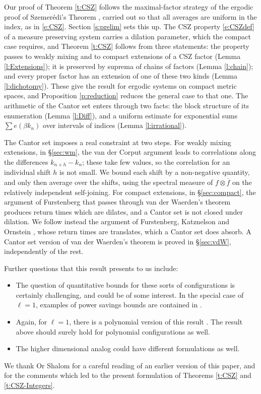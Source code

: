 Our proof of Theorem \ref{t:CSZ} follows the maximal-factor strategy of the ergodic proof of Szemer\'{e}di's Theorem \cites{MR0498471,MR670131}, 
carried out so that all averages are uniform in the index, as in \eqref{e:CSZ}.  
Section \ref{s:prelim} sets this up.  The CSZ property \eqref{e:CSZdef} of a measure preserving system carries a dilation parameter, which the compact case requires, 
and Theorem \ref{t:CSZ} follows from three statements: the property passes to weakly mixing and to compact extensions of a CSZ factor (Lemma \ref{l:Extensions}); 
it is preserved by suprema of chains of factors (Lemma \ref{l:chain}); and every proper factor has an extension of one of these two kinds (Lemma \ref{l:dichotomy}).  
These give the result for ergodic systems on compact metric spaces, and Proposition \ref{p:reduction} reduces the general case to that one.  
The arithmetic of the Cantor set enters through two facts: the block structure of its enumeration (Lemma \ref{l:Diff}), 
and a uniform estimate for exponential sums $\sum e(\beta k_n)$ over intervals of indices (Lemma \ref{l:irrational}).  

The Cantor set imposes a real constraint at two steps.  For weakly mixing extensions, in \S\ref{sec:wm}, the van der Corput argument leads to correlations 
along the differences $k_{n+h}-k_n$; these take few values, so the correlation for an individual shift $h$ is not small.  
We bound each shift by a non-negative quantity, and only then average over the shifts, using the spectral measure of $f\otimes \overline f$ on the 
relatively independent self-joining.  For compact extensions, in \S\ref{sec:compact}, the argument of Furstenberg that passes through van der Waerden's theorem 
produces return times which are dilates, and a Cantor set is not closed under dilation.  We follow instead the argument of Furstenberg, Katznelson and Ornstein \cite{MR670131}, 
whose return times are translates, which a Cantor set does absorb.  A Cantor set version of van der Waerden's theorem is proved in \S\ref{sec:vdW}, independently of the rest.  

Further questions that this result presents to us include: 
\begin{itemize}
    \item The question of quantitative bounds for these sorts of configurations is certainly challenging, and could be of some interest. 
  In the special case of $\ell=1$,  examples of power savings bounds are contained in \cite{firstpaper}. 
  
    \item  Again, for $\ell=1$, there is a polynomial version of this result \cite{firstpaper}. The result above should surely hold for polynomial configurations as well. 
    
    \item  The higher dimensional analog could have different formulations as well.  
    
\end{itemize}

\begin{ack}
    We thank Or Shalom for a careful reading of an earlier version of this paper, and for the comments which led to the
    present formulation of Theorems \ref{t:CSZ} and \ref{t:CSZ-Integers}.  
\end{ack}
